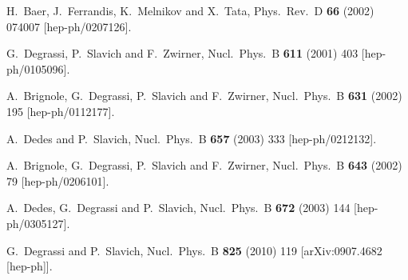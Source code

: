 \documentclass[final,3p,times,pdflatex]{elsarticle}
\begin{document}
\begin{thebibliography}{100}
  H.~Baer, J.~Ferrandis, K.~Melnikov and X.~Tata,
  Phys.\ Rev.\ D {\bf 66} (2002) 074007
  [hep-ph/0207126].

  G.~Degrassi, P.~Slavich and F.~Zwirner,
  Nucl.\ Phys.\ B {\bf 611} (2001) 403
  [hep-ph/0105096].

  A.~Brignole, G.~Degrassi, P.~Slavich and F.~Zwirner,
  Nucl.\ Phys.\ B {\bf 631} (2002) 195
  [hep-ph/0112177].

  A.~Dedes and P.~Slavich,
  Nucl.\ Phys.\ B {\bf 657} (2003) 333
  [hep-ph/0212132].

  A.~Brignole, G.~Degrassi, P.~Slavich and F.~Zwirner,
  Nucl.\ Phys.\ B {\bf 643} (2002) 79
  [hep-ph/0206101].

  A.~Dedes, G.~Degrassi and P.~Slavich,
  Nucl.\ Phys.\ B {\bf 672} (2003) 144
  [hep-ph/0305127].

  G.~Degrassi and P.~Slavich,
  Nucl.\ Phys.\ B {\bf 825} (2010) 119
  [arXiv:0907.4682 [hep-ph]].

\end{thebibliography}
\end{document}
